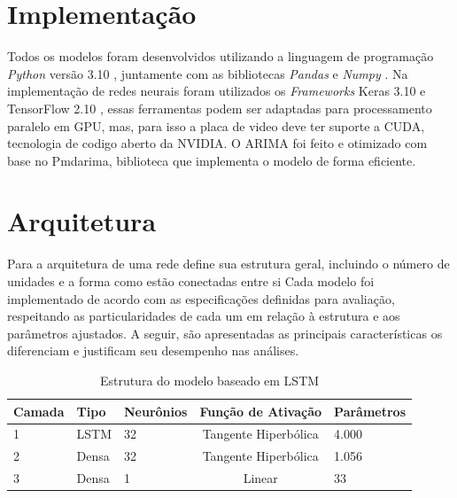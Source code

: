 \section{Implementação} \label{sec:implementacao}
Todos os modelos foram desenvolvidos utilizando a linguagem de programação \textit{Python} versão 3.10 \cite{ramalho}, juntamente com as bibliotecas \textit{Pandas} e \textit{Numpy} \cite{Data}. 
Na implementação de redes neurais foram utilizados os \textit{Frameworks} Keras 3.10 e TensorFlow 2.10 \cite{maosaobra}, essas ferramentas podem ser adaptadas para processamento paralelo em GPU, mas, para isso a placa de video deve ter suporte a CUDA, tecnologia de codigo aberto da NVIDIA.
O ARIMA foi feito e otimizado com base no Pmdarima, biblioteca que implementa o modelo de forma eficiente.

\section{Arquitetura} \label{sec:arquitetura}
Para \textcite{Good} a arquitetura de uma rede define sua estrutura geral, incluindo o número de unidades e a forma como estão conectadas entre si
Cada modelo foi implementado de acordo com as especificações definidas para avaliação, respeitando as particularidades de cada um em relação à estrutura e aos parâmetros ajustados.
A seguir, são apresentadas as principais características os diferenciam e justificam seu desempenho nas análises.

\begin{table}[h!] \label{tabela:lstm_struct}
    \caption{Estrutura do modelo baseado em LSTM}
    \begin{tabularx}{\textwidth}{X|X|X|c|X} \hline
    Camada & Tipo & Neurônios & Função de Ativação & Parâmetros \\ \hline
    1 & LSTM                    & 32 & Tangente Hiperbólica                           & 4.000                  \\ \hline
    2 & Densa                   & 32 & Tangente Hiperbólica                            & 1.056                    \\ \hline
    3 & Densa                   & 1  & Linear                           & 33                     \\ \hline
    \end{tabularx}
\end{table}

